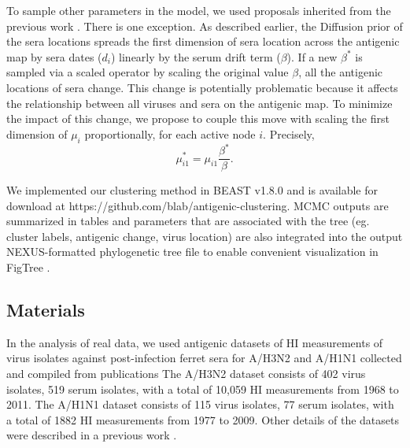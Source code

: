\documentclass[11pt,oneside,letterpaper]{article}
\begin{document}
To sample other parameters in the model, we used proposals inherited from the previous work \cite{bedford_integrating_2014}. 
There is one exception.
As described earlier, the Diffusion prior of the sera locations \cite{bedford_integrating_2014} spreads the first dimension of sera location across the antigenic map by sera dates ($d_i$) linearly by the serum drift term ($\beta$).
If a new $\beta^{*}$ is sampled via a scaled operator \cite{bedford_integrating_2014} by scaling the original value $\beta$, all the antigenic locations of sera change.
This change is potentially problematic because it affects the relationship between all viruses and sera on the antigenic map.
To minimize the impact of this change, we propose to couple this move with scaling the first dimension of $\mu_i$  proportionally, for each active node $i$. Precisely, 
\begin{equation}
\label{scaleMu1}
 \mu_{i1}^* = \mu_{i1} \frac{ \beta^*}{\beta} .
\end{equation}



We implemented our clustering method in BEAST v1.8.0 and is available for download at https://github.com/blab/antigenic-clustering.
MCMC outputs are summarized in tables and parameters that are associated with the tree (eg. cluster labels, antigenic change, virus location) are also integrated into the output NEXUS-formatted phylogenetic tree file to enable convenient visualization in FigTree \cite{FIGTREE}.


\subsection*{Materials}

In the analysis of real data, we used antigenic datasets \cite{bedford_integrating_2014} of HI measurements of virus isolates against post-infection ferret sera for A/H3N2 and A/H1N1 collected and compiled from publications \cite{Smith04,Kendal78,Webster79,Nakajima79,Nakajima81,Chakraverty82,Pereira82,Chakraverty86,Cox83,Daniels85,Raymond86,Stevens87,Donatelli93,Hay01,Daum02,McDonald07,Barr10}
The A/H3N2 dataset consists of 402 virus isolates, 519 serum isolates, with a total of 10,059 HI measurements from 1968 to 2011. 
The A/H1N1 dataset consists of 115 virus isolates, 77 serum isolates, with a total of 1882 HI measurements from 1977 to 2009.
Other details of the datasets were described in a previous work \cite{bedford_integrating_2014}.
\end{document}
